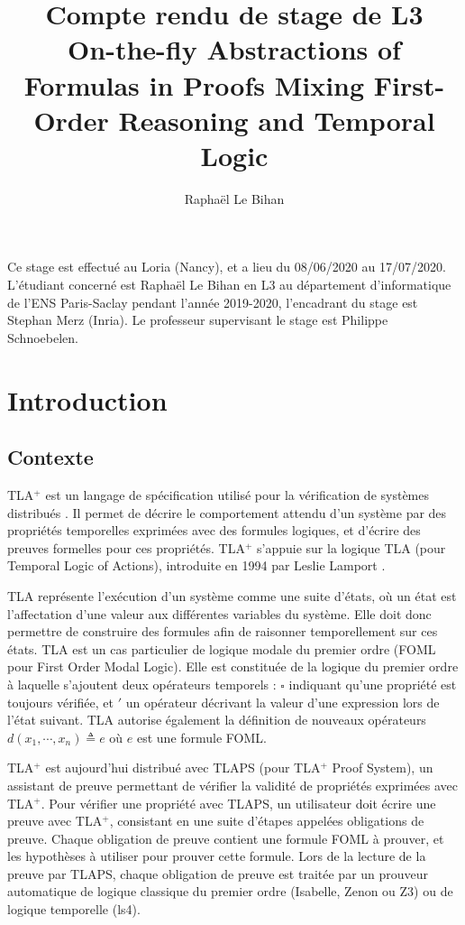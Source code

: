 \documentclass[12pt]{article}
\title{%
  Compte rendu de stage de L3\\
  \vspace{8pt}
  \large On-the-fly Abstractions of Formulas in Proofs
Mixing First-Order Reasoning and Temporal Logic}
\author{Raphaël Le Bihan}
\begin{document}
\fancyfoot[CEO]{\thepage}

\maketitle

Ce stage est effectué au Loria (Nancy), et a lieu du 08/06/2020 au 17/07/2020.
L'étudiant concerné est Raphaël Le Bihan en L3 au département d'informatique de l'ENS Paris-Saclay pendant l'année 2019-2020, l'encadrant du stage est Stephan Merz (Inria).
Le professeur supervisant le stage est Philippe Schnoebelen.

\setcounter{tocdepth}{2}
\tableofcontents

\section{Introduction}

\subsection{Contexte}

TLA$^+$ est un langage de spécification utilisé pour la vérification de systèmes distribués \cite{lamport2002}.
Il permet de décrire le comportement attendu d'un système par des propriétés temporelles exprimées avec des formules logiques, et d'écrire des preuves formelles pour ces propriétés.
TLA$^+$ s'appuie sur la logique TLA (pour Temporal Logic of Actions), introduite en 1994 par Leslie Lamport \cite{lamport1994}.

TLA représente l'exécution d'un système comme une suite d'états, où un état est l'affectation d'une valeur aux différentes variables du système.
Elle doit donc permettre de construire des formules afin de raisonner temporellement sur ces états.
TLA est un cas particulier de logique modale du premier ordre (FOML pour First Order Modal Logic).
Elle est constituée de la logique du premier ordre à laquelle s'ajoutent deux opérateurs temporels : $\square$ indiquant qu'une propriété est toujours vérifiée, et $'$ un opérateur décrivant la valeur d'une expression lors de l'état suivant.
TLA autorise également la définition de nouveaux opérateurs $d(x_1, \cdots, x_n) \triangleq e$ où $e$ est une formule FOML.

TLA$^+$ est aujourd'hui distribué avec TLAPS \cite{TLAPSurl} (pour TLA$^+$ Proof System), un assistant de preuve permettant de vérifier la validité de propriétés exprimées avec TLA$^+$.
Pour vérifier une propriété avec TLAPS, un utilisateur doit écrire une preuve avec TLA$^+$, consistant en une suite d'étapes appelées obligations de preuve.
Chaque obligation de preuve contient une formule FOML à prouver, et les hypothèses à utiliser pour prouver cette formule.
Lors de la lecture de la preuve par TLAPS, chaque obligation de preuve est traitée par un prouveur automatique de logique classique du premier ordre (Isabelle, Zenon ou Z3) ou de logique temporelle (ls4).
\end{document}
